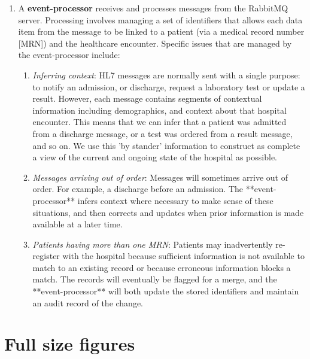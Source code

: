 \documentclass[pmlr,twocolumn,10pt]{jmlr} %
\begin{document}
\begin{enumerate}
    \item A \textbf{event-processor} receives and processes messages from the RabbitMQ server. Processing involves managing a set of identifiers that allows each data item from the message to be linked to a patient (via a medical record number [MRN]) and the healthcare encounter. Specific issues that are managed by the event-processor include:
    \begin{enumerate}
        \item \textit{Inferring context}: HL7 messages are normally sent with a single purpose: to notify an admission, or discharge, request a laboratory test or update a result. However, each message contains segments of contextual information including demographics, and context about that hospital encounter. This means that we can infer that a patient was admitted from a discharge message, or a test was ordered from a result message, and so on. We use this 'by stander' information to construct as complete a view of the current and ongoing state of the hospital as possible.
        \item \textit{Messages arriving out of order}: Messages will sometimes arrive out of order. For example, a discharge before an admission. The **event-processor** infers context where necessary to make sense of these situations, and then corrects and updates when prior information is made available at a later time.
        \item \textit{Patients having more than one MRN}: Patients may inadvertently re-register with the hospital because sufficient information is not available to match to an existing record or because erroneous information blocks a match. The records will eventually be flagged for a merge, and the **event-processor** will both update the stored identifiers and maintain an audit record of the change.
    \end{enumerate}
\end{enumerate}

\section{Full size figures}\label{apd:second}
\end{document}

